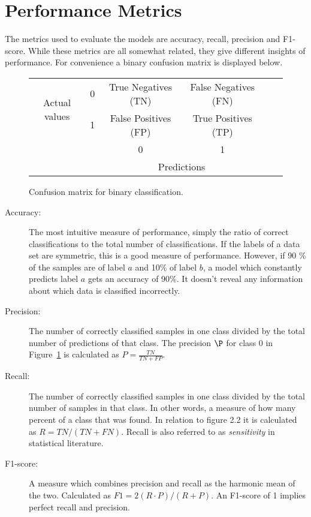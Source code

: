 \section{Performance Metrics}
The metrics used to evaluate the models are accuracy, recall, precision and F1-score. While these metrics are all somewhat related, they give different insights of performance. For convenience a binary confusion matrix is displayed below. 

\begin{figure}
\centering
\begin{tabular}{cccccc}
     \multirow{2}{*}{Actual values} & 0 & \multicolumn{1}{|c|}{True Negatives (TN)} &  \multicolumn{1}{c|}{False Negatives (FN)} \\\cline{2-4}
      & 1 & \multicolumn{1}{|c|}{False Positives (FP)} & \multicolumn{1}{c|}{True Positives (TP)} \\\cline{2-4}
     & & \multicolumn{1}{|c|}{0} & \multicolumn{1}{c|}{1} & \\
      & & \multicolumn{2}{c}{Predictions} & \\
\end{tabular}
\caption{Confusion matrix for binary classification.}
\label{fig:cm}
\end{figure}


\begin{description}
    \item[Accuracy:] The most intuitive measure of performance, simply the ratio of correct classifications to the total number of classifications. If the labels of a data set are symmetric, this is a good measure of performance. However, if 90 \%  of the samples are of label $a$ and 10\% of label $b$, a model which constantly predicts label $a$ gets an accuracy of 90\%. It doesn't reveal any information about which data is classified incorrectly. 
    \item[Precision:] The number of correctly classified samples in one class divided by the total number of predictions of that class. The precision $\P$ for class 0 in Figure~\ref{fig:cm} is calculated as $\displaystyle{P = \frac{TN}{TN + FP}}$. 
    \item[Recall:] The number of correctly classified samples in one class divided by the total number of samples in that class. In other words, a measure of how many percent of a class that was found. In relation to figure 2.2 it is calculated as $\textit{R} = \textit{TN}/(\textit{TN} + \textit{FN})$. Recall is also referred to as \textit{sensitivity} in statistical literature. 
    \item[F1-score:] A measure which combines precision and recall as the harmonic mean of the two. Calculated as $\textit{F1} = 2 (\textit{R} \cdot \textit{P}) / (\textit{R} + \textit{P})$. An F1-score of 1 implies perfect recall and precision.
\end{description}

